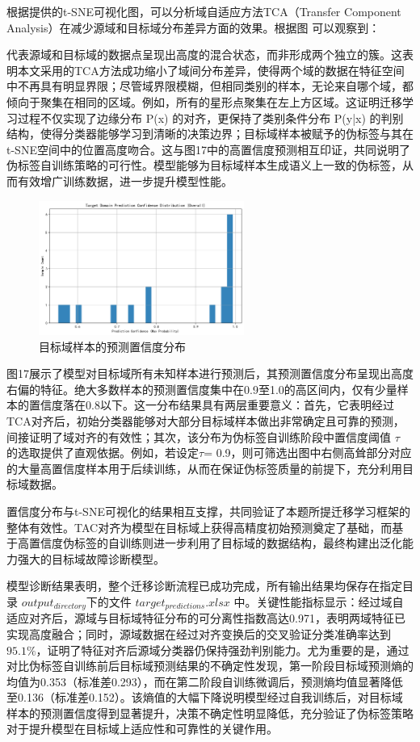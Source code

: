 \documentclass[a4paper]{CPIPC}
\numberwithin{equation}{section}
\begin{document}
根据提供的t-SNE可视化图，可以分析域自适应方法TCA（Transfer Component Analysis）在减少源域和目标域分布差异方面的效果。根据图 可以观察到：

代表源域和目标域的数据点呈现出高度的混合状态，而非形成两个独立的簇。这表明本文采用的TCA方法成功缩小了域间分布差异，使得两个域的数据在特征空间中不再具有明显界限；尽管域界限模糊，但相同类别的样本，无论来自哪个域，都倾向于聚集在相同的区域。例如，所有的星形点聚集在左上方区域。这证明迁移学习过程不仅实现了边缘分布 P(x) 的对齐，更保持了类别条件分布 P(y|x) 的判别结构，使得分类器能够学习到清晰的决策边界；目标域样本被赋予的伪标签与其在t-SNE空间中的位置高度吻合。这与图17中的高置信度预测相互印证，共同说明了伪标签自训练策略的可行性。模型能够为目标域样本生成语义上一致的伪标签，从而有效增广训练数据，进一步提升模型性能\cite{ref7}。

\begin{figure}[H]
  \centering
  \includegraphics[width=0.6\textwidth]{目标域样本的预测置信度分布.png}
  \caption{目标域样本的预测置信度分布}
  \label{fig:confidence}
\end{figure}
图17展示了模型对目标域所有未知样本进行预测后，其预测置信度分布呈现出高度右偏的特征。绝大多数样本的预测置信度集中在0.9至1.0的高区间内，仅有少量样本的置信度落在0.8以下。这一分布结果具有两层重要意义：首先，它表明经过TCA对齐后，初始分类器能够对大部分目标域样本做出非常确定且可靠的预测，间接证明了域对齐的有效性；其次，该分布为伪标签自训练阶段中置信度阈值 $\tau$ 的选取提供了直观依据。例如，若设定$\tau$= 0.9，则可筛选出图中右侧高耸部分对应的大量高置信度样本用于后续训练，从而在保证伪标签质量的前提下，充分利用目标域数据。

置信度分布与t-SNE可视化的结果相互支撑，共同验证了本题所提迁移学习框架的整体有效性。TAC对齐为模型在目标域上获得高精度初始预测奠定了基础，而基于高置信度伪标签的自训练则进一步利用了目标域的数据结构，最终构建出泛化能力强大的目标域故障诊断模型\cite{ref8}。

模型诊断结果表明，整个迁移诊断流程已成功完成，所有输出结果均保存在指定目录 $output_{directory}$下的文件 $target_{predictions}.xlsx$ 中。关键性能指标显示：经过域自适应对齐后，源域与目标域特征分布的可分离性指数高达0.971，表明两域特征已实现高度融合；同时，源域数据在经过对齐变换后的交叉验证分类准确率达到$95.1\%$，证明了特征对齐后源域分类器仍保持强劲判别能力。尤为重要的是，通过对比伪标签自训练前后目标域预测结果的不确定性发现，第一阶段目标域预测熵的均值为0.353（标准差0.293），而在第二阶段自训练微调后，预测熵均值显著降低至0.136（标准差0.152）。该熵值的大幅下降说明模型经过自我训练后，对目标域样本的预测置信度得到显著提升，决策不确定性明显降低，充分验证了伪标签策略对于提升模型在目标域上适应性和可靠性的关键作用。
\end{document}

